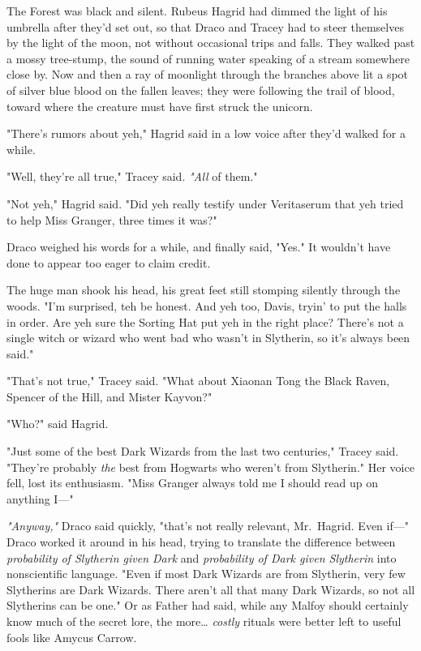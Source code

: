 The Forest was black and silent. Rubeus Hagrid had dimmed the light of his umbrella after they'd set out, so that Draco and Tracey had to steer themselves by the light of the moon, not without occasional trips and falls. They walked past a mossy tree-stump, the sound of running water speaking of a stream somewhere close by. Now and then a ray of moonlight through the branches above lit a spot of silver blue blood on the fallen leaves; they were following the trail of blood, toward where the creature must have first struck the unicorn.

"There's rumors about yeh," Hagrid said in a low voice after they'd walked for a while.

"Well, they're all true," Tracey said. \emph{"All} of them."

"Not yeh," Hagrid said. "Did yeh really testify under Veritaserum that yeh tried to help Miss Granger, three times it was?"

Draco weighed his words for a while, and finally said, "Yes." It wouldn't have done to appear too eager to claim credit.

The huge man shook his head, his great feet still stomping silently through the woods. "I'm surprised, teh be honest. And yeh too, Davis, tryin' to put the halls in order. Are yeh sure the Sorting Hat put yeh in the right place? There's not a single witch or wizard who went bad who wasn't in Slytherin, so it's always been said."

"That's not true," Tracey said. "What about Xiaonan Tong the Black Raven, Spencer of the Hill, and Mister Kayvon?"

"Who?" said Hagrid.

"Just some of the best Dark Wizards from the last two centuries," Tracey said. "They're probably \emph{the} best from Hogwarts who weren't from Slytherin." Her voice fell, lost its enthusiasm. "Miss Granger always told me I should read up on anything I---"

\emph{"Anyway,"} Draco said quickly, "that's not really relevant, Mr.~Hagrid. Even if---" Draco worked it around in his head, trying to translate the difference between \emph{probability of Slytherin given Dark} and \emph{probability of Dark given Slytherin} into nonscientific language. "Even if most Dark Wizards are from Slytherin, very few Slytherins are Dark Wizards. There aren't all that many Dark Wizards, so not all Slytherins can be one." Or as Father had said, while any Malfoy should certainly know much of the secret lore, the more{\ldots} \emph{costly} rituals were better left to useful fools like Amycus Carrow.

